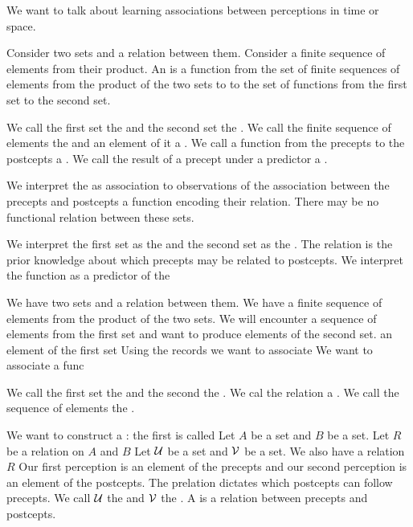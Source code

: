 
\sbasic









\sstart
{}


We want to talk about learning
associations between perceptions
in time or space.


Consider two sets
and a relation between them.
Consider a finite sequence of elements
from their product.
An  is a function
from the set of finite sequences of
elements from the product of the two
sets to to the set of functions from
the first set to the second set.

We call the first set the
 and the second
set the
.
We call the finite sequence of
elements the 
and an element of it a .
We call a function from the precepts
to the postcepts a .
We call the result of a precept
under a predictor a .

We interpret the  as
association to observations of the
association between the precepts
and postcepts a function encoding
their relation. There may be no
functional relation between these
sets.

We interpret the first set
as the 
and the second set as the
. The relation
is the prior knowledge about
which precepts may be related to
postcepts.
We interpret the function as a
predictor of the



We have two sets and a relation
between them.
We have a finite sequence of
elements from the product of
the two sets.
We will encounter a sequence of
elements from the first set
and want to produce elements of
the second set.
an element
of the first set
Using the records we want to
associate
We want to associate a func

We call the first set the
 and the second the
. We cal the relation
a .
We call the sequence of elements
the .

We want to construct a
: the
first is called
Let $A$ be a set and $B$
be a set. Let $R$ be a relation
on $A$ and $B$
Let $\mathcal{U}$ be a set
and $\mathcal{V}$ be a set.
We also have a relation $R$
Our first perception is an
element of the precepts and
our second perception is an
element of the postcepts.
The prelation dictates which
postcepts can follow precepts.
We call $\mathcal{U}$ the
and $\mathcal{V}$ the .
A  is
a relation between precepts
and postcepts.


